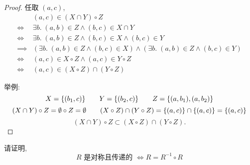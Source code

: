 \documentclass[a4paper, justified]{tufte-handout}
\begin{document}
\begin{proof}
  任取 $(a, c)$,
  \setcounter{equation}{0}
  \begin{align}
    & (a, c) \in (X \cap Y) \circ Z \\[6pt]
    \iff & \exists b.\; (a, b) \in Z \land (b, c) \in X \cap Y \\[6pt]
    \iff & \exists b.\; (a, b) \in Z \land (b, c) \in X \land (b, c) \in Y \\[6pt]
    \implies & (\exists b.\; (a, b) \in Z \land (b, c) \in X)
      \land (\exists b.\; (a, b) \in Z \land (b, c) \in Y) \\[6pt]
    \iff & (a, c) \in X \circ Z \land (a, c) \in Y \circ Z \\[6pt]
    \iff & (a, c) \in (X \circ Z) \cap (Y \circ Z)
  \end{align}

  举例:
  \[
    X = \{(b_{1}, c)\}
    \qquad Y = \{(b_{2}, c)\}
    \qquad Z = \{(a, b_{1}), (a, b_{2})\}
  \]
  \[
    (X \cap Y) \circ Z = \emptyset \circ Z = \emptyset
    \qquad (X \circ Z) \cap (Y \circ Z) = \{(a, c)\} \cap \{(a, c)\} = \{(a, c)\}
  \]
  \[
    (X \cap Y) \circ Z \subset (X \circ Z) \cap (Y \circ Z).
  \]
\end{proof}

\begin{problem}
  请证明,
  \[
    R \text{ 是对称且传递的 } \iff R = R^{-1} \circ R
  \]
\end{problem}
\end{document}

